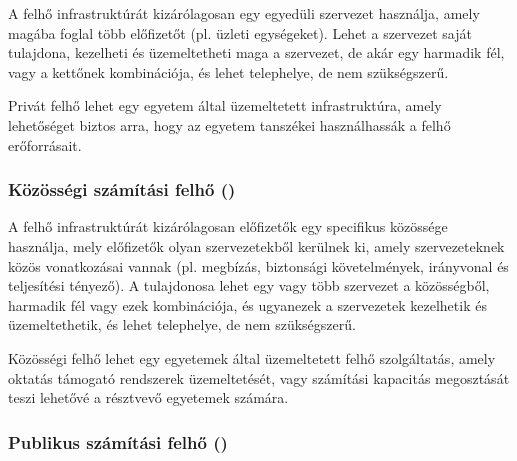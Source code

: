 A felhő infrastruktúrát kizárólagosan egy egyedüli szervezet használja, amely magába foglal több előfizetőt (pl. üzleti egységeket). Lehet a szervezet saját tulajdona, kezelheti és üzemeltetheti maga a szervezet, de akár egy harmadik fél, vagy a kettőnek kombinációja, és lehet telephelye, de nem szükségszerű.

Privát felhő lehet egy egyetem által üzemeltetett infrastruktúra, amely lehetőséget biztos arra, hogy az egyetem tanszékei használhassák a felhő erőforrásait.

\subsubsection{Közösségi számítási felhő ()}

A felhő infrastruktúrát kizárólagosan előfizetők egy specifikus közössége használja, mely előfizetők olyan szervezetekből kerülnek ki, amely szervezeteknek közös vonatkozásai vannak (pl. megbízás, biztonsági követelmények, irányvonal és teljesítési tényező). A tulajdonosa lehet egy vagy több szervezet a közösségből, harmadik fél vagy ezek kombinációja, és ugyanezek a szervezetek kezelhetik és üzemeltethetik, és lehet telephelye, de nem szükségszerű.

Közösségi felhő lehet egy egyetemek által üzemeltetett felhő szolgáltatás, amely oktatás támogató rendszerek üzemeltetését, vagy számítási kapacitás megosztását teszi lehetővé a résztvevő egyetemek számára. 

\subsubsection{Publikus számítási felhő ()}

